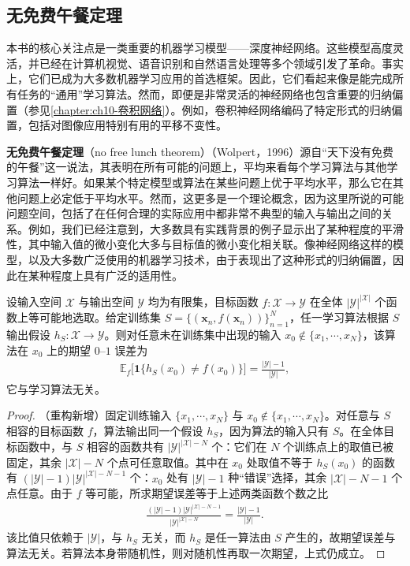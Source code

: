 \documentclass[../../main.tex]{subfiles}
\begin{document}
\subsection{无免费午餐定理}\label{subsection:ch09-无免费午餐}

本书的核心关注点是一类重要的机器学习模型——深度神经网络。这些模型高度灵活，并已经在计算机视觉、语音识别和自然语言处理等多个领域引发了革命。事实上，它们已成为大多数机器学习应用的首选框架。因此，它们看起来像是能完成所有任务的“通用”学习算法。然而，即便是非常灵活的神经网络也包含重要的归纳偏置（参见\cref{chapter:ch10-卷积网络}）。例如，卷积神经网络编码了特定形式的归纳偏置，包括对图像应用特别有用的平移不变性。

\textbf{无免费午餐定理}（no free lunch theorem）（Wolpert，1996）源自“天下没有免费的午餐”这一说法，其表明在所有可能的问题上，平均来看每个学习算法与其他学习算法一样好。如果某个特定模型或算法在某些问题上优于平均水平，那么它在其他问题上必定低于平均水平。然而，这更多是一个理论概念，因为这里所说的可能问题空间，包括了在任何合理的实际应用中都非常不典型的输入与输出之间的关系。例如，我们已经注意到，大多数具有实践背景的例子显示出了某种程度的平滑性，其中输入值的微小变化大多与目标值的微小变化相关联。像神经网络这样的模型，以及大多数广泛使用的机器学习技术，由于表现出了这种形式的归纳偏置，因此在某种程度上具有广泛的适用性。

\begin{theorem}[无免费午餐定理]\label{theorem:ch09-无免费午餐}
设输入空间 $\mathcal{X}$ 与输出空间 $\mathcal{Y}$ 均为有限集，目标函数 $f:\mathcal{X}\to\mathcal{Y}$ 在全体 $|\mathcal{Y}|^{|\mathcal{X}|}$ 个函数上等可能地选取。给定训练集 $S=\{(\boldsymbol{x}_{n},f(\boldsymbol{x}_{n}))\}_{n=1}^{N}$，任一学习算法根据 $S$ 输出假设 $h_{S}:\mathcal{X}\to\mathcal{Y}$。则对任意未在训练集中出现的输入 $x_{0}\notin\{x_{1},\cdots,x_{N}\}$，该算法在 $x_{0}$ 上的期望 $0$--$1$ 误差为
\begin{align*}
\mathbb{E}_{f}\bigl[\mathbf{1}\{h_{S}(x_{0})\neq f(x_{0})\}\bigr]=\frac{|\mathcal{Y}|-1}{|\mathcal{Y}|},
\end{align*}
它与学习算法无关。
\end{theorem}

\begin{proof}
（重构新增）固定训练输入 $\{x_{1},\cdots,x_{N}\}$ 与 $x_{0}\notin\{x_{1},\cdots,x_{N}\}$。对任意与 $S$ 相容的目标函数 $f$，算法输出同一个假设 $h_{S}$，因为算法的输入只有 $S$。在全体目标函数中，与 $S$ 相容的函数共有 $|\mathcal{Y}|^{|\mathcal{X}|-N}$ 个：它们在 $N$ 个训练点上的取值已被固定，其余 $|\mathcal{X}|-N$ 个点可任意取值。其中在 $x_{0}$ 处取值不等于 $h_{S}(x_{0})$ 的函数有 $(|\mathcal{Y}|-1)|\mathcal{Y}|^{|\mathcal{X}|-N-1}$ 个：$x_{0}$ 处有 $|\mathcal{Y}|-1$ 种“错误”选择，其余 $|\mathcal{X}|-N-1$ 个点任意。由于 $f$ 等可能，所求期望误差等于上述两类函数个数之比
\begin{align*}
\frac{(|\mathcal{Y}|-1)|\mathcal{Y}|^{|\mathcal{X}|-N-1}}{|\mathcal{Y}|^{|\mathcal{X}|-N}}=\frac{|\mathcal{Y}|-1}{|\mathcal{Y}|}.
\end{align*}
该比值只依赖于 $|\mathcal{Y}|$，与 $h_{S}$ 无关，而 $h_{S}$ 是任一算法由 $S$ 产生的，故期望误差与算法无关。若算法本身带随机性，则对随机性再取一次期望，上式仍成立。
\end{proof}
\end{document}
